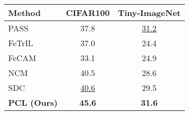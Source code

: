 \begin{tabular}{@{\kern0.5em}lcc@{\kern0.5em}}
    \toprule
    \textbf{Method} &\textbf{CIFAR100} &\textbf{Tiny-ImageNet} \\
    \midrule \midrule
    PASS \cite{pass} &37.8 &\underline{31.2} \\
    FeTrIL \cite{fetril} &37.0 &24.4 \\
    FeCAM \cite{fecam} &33.1  &24.9 \\
    NCM \cite{icarl} &40.5 &28.6 \\
    SDC \cite{sdc} &\underline{40.6} &29.5 \\
    \midrule
    \rowcolor{black!5}
    \textbf{PCL (Ours)} &\textbf{45.6} &\textbf{31.6}\\
    \bottomrule \bottomrule
\end{tabular}
